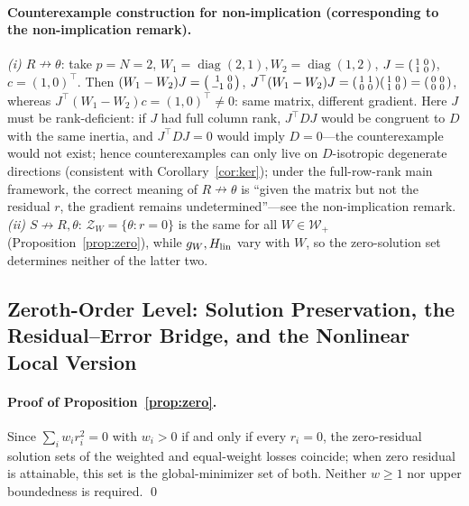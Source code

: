 \documentclass[11pt]{article}
\newcommand{\W}{W}
\DeclareMathOperator{\diag}{diag}
\numberwithin{equation}{section}
\begin{document}
\paragraph{Counterexample construction for non-implication (corresponding to the non-implication remark).}
\emph{(i) $R\nrightarrow\theta$}: take $p=N=2$, $\W_1=\diag(2,1),\W_2=\diag(1,2)$, $J=\begin{psmallmatrix}1&0\\1&0\end{psmallmatrix}$, $c=(1,0)^\top$. Then $(\W_1-\W_2)J=\begin{psmallmatrix}1&0\\-1&0\end{psmallmatrix}$, $J^\top(\W_1-\W_2)J=\begin{psmallmatrix}1&1\\0&0\end{psmallmatrix}\begin{psmallmatrix}1&0\\1&0\end{psmallmatrix}=\begin{psmallmatrix}0&0\\0&0\end{psmallmatrix}$, whereas $J^\top(\W_1-\W_2)c=(1,0)^\top\neq0$: same matrix, different gradient. Here $J$ must be rank-deficient: if $J$ had full column rank, $J^\top D J$ would be congruent to $D$ with the same inertia, and $J^\top D J=0$ would imply $D=0$---the counterexample would not exist; hence counterexamples can only live on $D$-isotropic degenerate directions (consistent with Corollary~\ref{cor:ker}); under the full-row-rank main framework, the correct meaning of $R\nrightarrow\theta$ is ``given the matrix but not the residual $r$, the gradient remains undetermined''---see the non-implication remark. \emph{(ii) $S\nrightarrow R,\theta$}: $\mathcal Z_{\W}=\{\theta:r=0\}$ is the same for all $\W\in\mathcal W_+$ (Proposition~\ref{prop:zero}), while $g_{\W},H_{\rm lin}$ vary with $\W$, so the zero-solution set determines neither of the latter two.

\subsection{Zeroth-Order Level: Solution Preservation, the Residual--Error Bridge, and the Nonlinear Local Version}
\paragraph{Proof of Proposition~\ref{prop:zero}.}
Since $\sum_i w_i r_i^2=0$ with $w_i>0$ if and only if every $r_i=0$, the zero-residual solution sets of the weighted and equal-weight losses coincide; when zero residual is attainable, this set is the global-minimizer set of both. Neither $w\ge1$ nor upper boundedness is required. \qed
\end{document}
